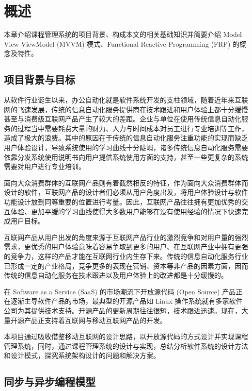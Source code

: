 \chapter{概述}

本章介绍课程管理系统的项目背景、构成本文的相关基础知识并简要介绍 Model View ViewModel (MVVM) 模式、Functional Reactive Programming (FRP) 的概念及特性。

\section{项目背景与目标}

从软件行业诞生以来，办公自动化就是软件系统开发的支柱领域，随着近年来互联网的飞速发展，传统的信息自动化服务提供商在技术跟进和用户体验上都十分缓慢甚至与消费级互联网产品产生了较大的差距。企业与单位在使用传统信息自动化服务的过程当中需要耗费大量的财力、人力与时间成本对员工进行专业培训等工作，造成了极大的浪费。其中的原因在于传统的信息自动化服务注重功能的实现而缺乏用户体验设计，导致系统使用的学习曲线十分陡峭，诸多传统信息自动化服务需要依靠分发系统使用说明书向用户提供系统使用方面的支持，甚至一些更复杂的系统需要对用户进行专业培训。

面向大众消费群体的互联网产品则有着截然相反的特征，作为面向大众消费群体而设计的软件，互联网产品的设计者们必须从用户角度出发，将用户体验设计与软件功能设计放到同等重要的位置进行考量。因此，互联网产品往往拥有更加优秀的交互体验、更加平缓的学习曲线使得大多数用户能够在没有使用经验的情况下快速完成用户目标。

互联网产品从用户出发的角度来源于互联网产品行业的激烈竞争和对用户量的强烈需求，更优秀的用户体验意味着容易争取到更多的用户、在互联网产业中拥有更强的竞争力，这样的产品才能在互联网行业内生存下来。传统的信息自动化服务行业已形成一定的产业格局，竞争更多的表现在营销、资本等非产品的因素方面，因而传统的信息自动化服务在技术跟进以及用户体验上的改进都是十分缓慢的。

在 Software as a Service (SaaS) 的市场潮流下开放源代码 (Open Source) 产品正在逐渐主导软件产品的市场，最典型的开源产品如 Linux 操作系统就有多家软件公司为其提供技术支持。开源产品的更新周期往往很短，技术跟进迅速。现在，大量开源产品正支持着互联网与移动互联网产品的开发。

本项目通过吸收借鉴移动互联网的设计思路，以开放源代码的方式设计并实现课程管理系统，同时，通过课程管理系统的设计与实现，总结分析软件系统的设计方法和设计模式，探究系统架构设计的问题和解决方案。

\section{同步与异步编程模型}


